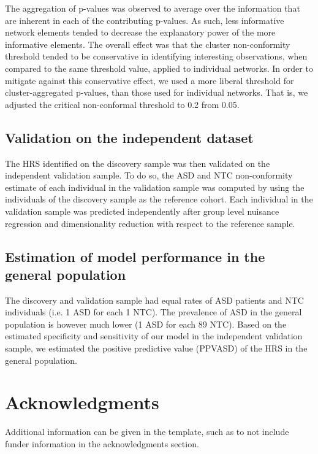 \documentclass[9pt,lineno]{elife}
\begin{document}
The aggregation of p-values was observed to average over the information that are inherent in each of the contributing p-values. As such, less informative network elements tended to decrease the explanatory power of the more informative elements. The overall effect was that the cluster non-conformity threshold tended to be conservative in identifying interesting observations, when compared to the same threshold value, applied to individual networks. In order to mitigate against this conservative effect, we used a more liberal threshold for cluster-aggregated p-values, than those used for individual networks. That is, we adjusted the critical non-conformal threshold to 0.2 from 0.05. 

\subsection{Validation on the independent dataset}
The HRS identified on the discovery sample was then validated on the independent validation sample. To do so, the ASD and NTC non-conformity estimate of each individual in the validation sample was computed by using the individuals of the discovery sample as the reference cohort. Each individual in the validation sample was predicted independently after group level nuisance regression and dimensionality reduction with respect to the reference sample.

\subsection{Estimation of model performance in the general population}
The discovery and validation sample had equal rates of ASD patients and NTC individuals (i.e. 1 ASD for each 1 NTC). The prevalence of ASD in the general population is however much lower (1 ASD for each 89 NTC). Based on the estimated specificity and sensitivity of our model in the independent validation sample, we estimated the positive predictive value (PPVASD) of the HRS in the general population.

\section{Acknowledgments}

Additional information can be given in the template, such as to not include funder information in the acknowledgments section.



\end{document}

